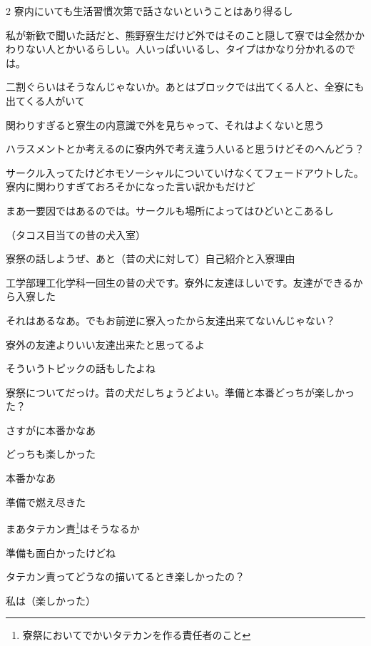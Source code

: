 \begin{multicols}{2}
 寮内にいても生活習慣次第で話さないということはあり得るし

 私が新歓で聞いた話だと、熊野寮生だけど外ではそのこと隠して寮では全然かかわりない人とかいるらしい。人いっぱいいるし、タイプはかなり分かれるのでは。

 二割ぐらいはそうなんじゃないか。あとはブロックでは出てくる人と、全寮にも出てくる人がいて

 関わりすぎると寮生の内意識で外を見ちゃって、それはよくないと思う

 ハラスメントとか考えるのに寮内外で考え違う人いると思うけどそのへんどう？

 サークル入ってたけどホモソーシャルについていけなくてフェードアウトした。寮内に関わりすぎておろそかになった言い訳かもだけど

 まあ一要因ではあるのでは。サークルも場所によってはひどいとこあるし

（タコス目当ての昔の犬入室）


 寮祭の話しようぜ、あと（昔の犬に対して）自己紹介と入寮理由

 工学部理工化学科一回生の昔の犬です。寮外に友達ほしいです。友達ができるから入寮した

 それはあるなあ。でもお前逆に寮入ったから友達出来てないんじゃない？

 寮外の友達よりいい友達出来たと思ってるよ

 そういうトピックの話もしたよね

 寮祭についてだっけ。昔の犬だしちょうどよい。準備と本番どっちが楽しかった？

 さすがに本番かなあ

 どっちも楽しかった

 本番かなあ

 準備で燃え尽きた

 まあタテカン責\footnote{寮祭においてでかいタテカンを作る責任者のこと}はそうなるか

 準備も面白かったけどね

 タテカン責ってどうなの描いてるとき楽しかったの？

 私は（楽しかった）


\end{multicols}
